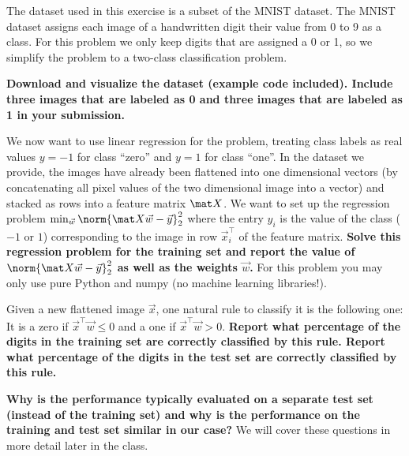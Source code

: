 \documentclass[preview]{standalone}
\begin{document}
\begin{Parts}

\Part The dataset used in this exercise is a subset of the MNIST dataset.
The MNIST dataset assigns
each image of a handwritten digit their value from 0 to 9 as a class.
For this problem we only keep digits that are assigned a 0 or 1, so we
simplify the problem to a two-class classification problem.

\textbf{Download and visualize the dataset (example code included). Include three
images that are labeled as 0 and three images that are labeled as 1
in your submission.}



\Part We now want to use linear regression for the problem, treating class
labels as real values $y = -1$ for class ``zero'' and $y = 1$ for class ``one''. In the dataset we
provide, the images have already been flattened into one dimensional vectors
(by concatenating all pixel values of the two dimensional image into a vector)
and stacked as rows into a feature matrix $\mat X$. We want to set up the regression
problem $\min_{\vec w}\norm{\mat X\vec w - \vec y}_2^2$ where the entry $y_i$ is the value of the
class ($-1$ or $1$) corresponding to the image in row $\vec{x}_i^\top$ of the feature matrix.
\textbf{Solve this regression problem for the training set and report the value of
$\norm{\mat X\vec w - \vec y}_2^2$ as well as the weights $\vec w$.} For this problem you
may only use pure Python and numpy (no machine learning libraries!).



\item Given a new flattened image $\vec x$, one natural rule to classify it is
the following one: It is a zero if $\vec x^\top \vec w \leq 0$ and a one if
$\vec x^\top \vec w > 0$. \textbf{Report what percentage of the digits in the training set
are correctly classified by this rule. Report what percentage of the digits in the test
set are correctly classified by this rule.}



\Part \textbf{Why is the performance typically evaluated on a separate test set
(instead of the training set) and why is the performance on the training and
test set similar in our case?} We will cover these questions in more detail
later in the class.



\end{Parts}
\end{document}
